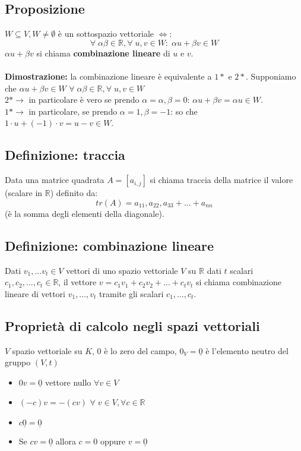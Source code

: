 \subsection{Proposizione}

\(W\subseteq V,W\neq\emptyset\) è un sottospazio vettoriale \(\Leftrightarrow\):
\[\forall\;\alpha\beta\in\mathbb{R},\forall\; u,v\in W:\; \alpha u+\beta v\in W\]
\(\alpha u+\beta v\) si chiama \textbf{combinazione lineare} di \(u\) e \(v\).
\\
\\\textbf{Dimostrazione:} la combinazione lineare è equivalente a \(1*\) e \(2*\).
Supponiamo che \(\alpha u+\beta v\in W\) \(\forall\;\alpha\beta\in\mathbb{R},\forall\; u,v\in W\)
\\\(2*\rightarrow\) in particolare è vero se prendo \(\alpha =\alpha, \beta=0\): \(\alpha u+\beta v=\alpha u\in W\).
\\\(1*\rightarrow\) in particolare, se prendo \(\alpha =1,\beta =-1\): so che \(1\cdot u+(-1)\cdot v= u-v\in W\).

\subsection{Definizione: traccia}
Data una matrice quadrata \(A=[a_{i,j}]\) si chiama traccia della matrice il valore (scalare in \(\mathbb{R}\)) definito da:
\[tr(A)=a_{11},a_{22},a_{33}+...+a_{nn}\]
(è la somma degli elementi della diagonale).

\subsection{Definizione: combinazione lineare}

Dati \(v_1,...v_t\in V\) vettori di uno spazio vettoriale \(V\) su \(\mathbb{R}\) dati \(t\) scalari \(c_1,c_2,...,c_t\in\mathbb{R}\), il vettore \(v=c_1v_1+c_2v_2+...+c_tv_t\) si chiama combinazione lineare di vettori \(v_1,...,v_t\) tramite gli scalari \(c_1,...,c_t\).

\subsection{Proprietà di calcolo negli spazi vettoriali}
\(V\) spazio vettoriale su \(K\), \(0\) è lo zero del campo, \(0_V=\underline{0}\) è l'elemento neutro del gruppo \((V,t)\)

\begin{itemize}

	\item \(0v=\underline{0}\) vettore nullo \(\forall v\in V\)

	\item \((-c)v=-(cv)\) \(\forall\;v\in V,\forall c\in\mathbb{R}\)

	\item \(c\underline{0}=\underline{0}\)

	\item Se \(cv=\underline{0}\) allora \(c=0\) oppure \(v=\underline{0}\)

\end{itemize}

